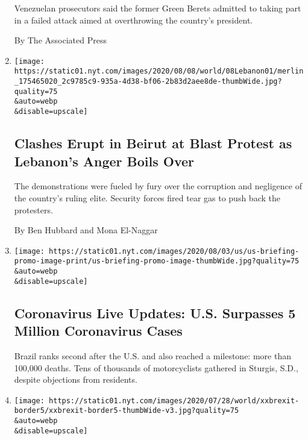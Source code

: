 \begin{enumerate}
  Venezuelan prosecutors said the former Green Berets admitted to taking
  part in a failed attack aimed at overthrowing the country's president.

  By The Associated Press
\item
  \href{/2020/08/08/world/middleeast/Beirut-explosion-protests-lebanon.html}{}

  \texttt{[image: https://static01.nyt.com/images/2020/08/08/world/08Lebanon01/merlin\_175465020\_2c9785c9-935a-4d38-bf06-2b83d2aee8de-thumbWide.jpg?quality=75\\\&auto=webp\\\&disable=upscale]}

  \hypertarget{clashes-erupt-in-beirut-at-blast-protest-as-lebanons-anger-boils-over-1}{%
  \subsection{Clashes Erupt in Beirut at Blast Protest as Lebanon's
  Anger Boils
  Over}\label{clashes-erupt-in-beirut-at-blast-protest-as-lebanons-anger-boils-over-1}}

  The demonstrations were fueled by fury over the corruption and
  negligence of the country's ruling elite. Security forces fired tear
  gas to push back the protesters.

  By Ben Hubbard and Mona El-Naggar
\item
  \href{/2020/08/08/world/coronavirus-updates.html}{}

  \texttt{[image: https://static01.nyt.com/images/2020/08/03/us/us-briefing-promo-image-print/us-briefing-promo-image-thumbWide.jpg?quality=75\\\&auto=webp\\\&disable=upscale]}

  \hypertarget{coronavirus-live-updates-us-surpasses-5-million-coronavirus-cases}{%
  \subsection{Coronavirus Live Updates: U.S. Surpasses 5 Million
  Coronavirus
  Cases}\label{coronavirus-live-updates-us-surpasses-5-million-coronavirus-cases}}

  Brazil ranks second after the U.S. and also reached a milestone: more
  than 100,000 deaths. Tens of thousands of motorcyclists gathered in
  Sturgis, S.D., despite objections from residents.
\item
  \href{/2020/08/08/world/europe/brexit-trucks-dover-mojo.html}{}

  \texttt{[image: https://static01.nyt.com/images/2020/07/28/world/xxbrexit-border5/xxbrexit-border5-thumbWide-v3.jpg?quality=75\\\&auto=webp\\\&disable=upscale]}


\end{enumerate}
